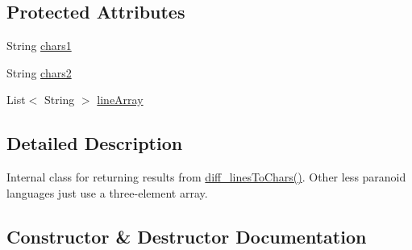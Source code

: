\subsection*{Protected Attributes}
\begin{DoxyCompactItemize}
\item 
String \hyperlink{classname_1_1fraser_1_1neil_1_1plaintext_1_1diff__match__patch_1_1LinesToCharsResult_a12daa534c2a4957abadb025674e5258d}{chars1}
\item 
String \hyperlink{classname_1_1fraser_1_1neil_1_1plaintext_1_1diff__match__patch_1_1LinesToCharsResult_a6dec911e50bdb1eeefb8d0e586b7d91f}{chars2}
\item 
List$<$ String $>$ \hyperlink{classname_1_1fraser_1_1neil_1_1plaintext_1_1diff__match__patch_1_1LinesToCharsResult_a3cf66c74c672cf71959901cacd01fdd4}{line\+Array}
\end{DoxyCompactItemize}


\subsection{Detailed Description}
Internal class for returning results from \hyperlink{classname_1_1fraser_1_1neil_1_1plaintext_1_1diff__match__patch_a9093987d32dbbe45e8dc547329ce1dac}{diff\+\_\+lines\+To\+Chars()}. Other less paranoid languages just use a three-\/element array. 

\subsection{Constructor \& Destructor Documentation}
